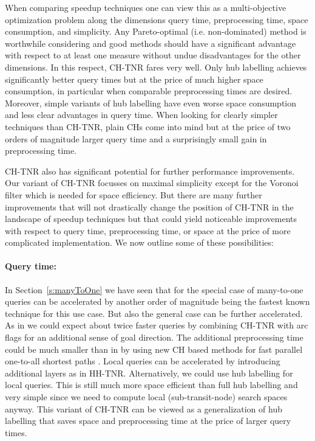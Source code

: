 \documentclass{llncs}
\begin{document}
When comparing speedup techniques one can view this as a multi-objective optimization problem along the dimensions query time, preprocessing time, space consumption, and simplicity. Any Pareto-optimal (i.e. non-dominated) method is worthwhile considering and good methods should have a significant advantage with respect to at least one measure without undue disadvantages for the other dimensions. In this respect, CH-TNR fares very well. Only hub labelling achieves significantly better query times but at the price of much higher space consumption, in particular when comparable preprocessing times are desired. 
Moreover, simple variants of hub labelling have even worse space consumption and less clear advantages in query time. When looking for clearly simpler techniques than CH-TNR, plain CHs come into mind but at the price of two orders of magnitude larger query time and a surprisingly small gain in preprocessing time. 

CH-TNR also has significant potential for further performance improvements. Our variant of CH-TNR focusses on maximal simplicity except for the Voronoi filter which is needed for space efficiency. But there are many further improvements that will not drastically change the position of CH-TNR in the landscape of speedup techniques but that could yield noticeable improvements with respect to query time, preprocessing time, or space at the price of more complicated implementation. We now outline some of these possibilities:

\paragraph*{Query time:}\label{sec:tnr-query-time}
In Section~\ref{s:manyToOne} we have seen that for the special case of many-to-one queries can be accelerated by another order of magnitude being the fastest known technique for this use case. But also the general case can be further accelerated. 
As in \cite{bdsssw-chgds-10} we could expect about twice faster queries by combining CH-TNR with arc flags for an additional sense of goal direction. The additional preprocessing time could be much smaller than in \cite{bdsssw-chgds-10} by using new CH based methods for fast parallel one-to-all shortest paths \cite{dgnw-phast-11}. Local queries can be accelerated by introducing additional layers as in HH-TNR.
Alternatively, we could use hub labelling for local queries.
This is still much more space efficient than full hub labelling and very simple since we need to compute local (sub-transit-node) search spaces anyway. 
This variant of CH-TNR can be viewed as a generalization of hub labelling that saves space and preprocessing time at the price of larger query times.
\end{document}
